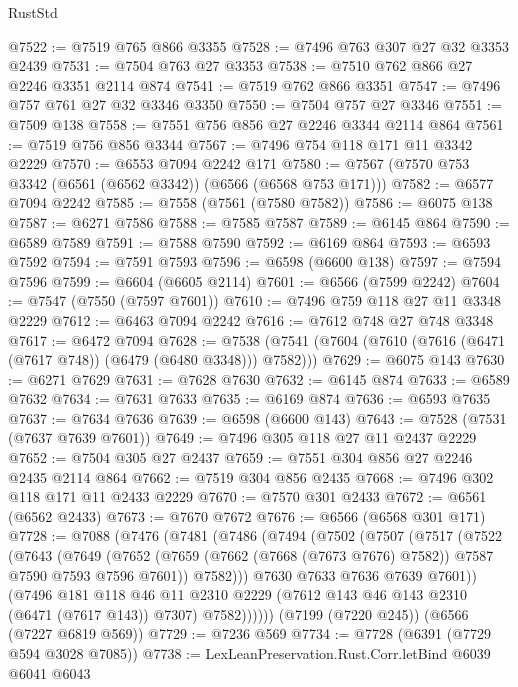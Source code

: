 \begin{lexlean}{RustStd}
\begin{coremodule}
@7522 := @7519 @765 @866 @3355
@7528 := @7496 @763 @307 @27 @32 @3353 @2439
@7531 := @7504 @763 @27 @3353
@7538 := @7510 @762 @866 @27 @2246 @3351 @2114 @874
@7541 := @7519 @762 @866 @3351
@7547 := @7496 @757 @761 @27 @32 @3346 @3350
@7550 := @7504 @757 @27 @3346
@7551 := @7509 @138
@7558 := @7551 @756 @856 @27 @2246 @3344 @2114 @864
@7561 := @7519 @756 @856 @3344
@7567 := @7496 @754 @118 @171 @11 @3342 @2229
@7570 := @6553 @7094 @2242 @171
@7580 := @7567 (@7570 @753 @3342 (@6561 (@6562 @3342)) (@6566 (@6568 @753 @171)))
@7582 := @6577 @7094 @2242
@7585 := @7558 (@7561 (@7580 @7582))
@7586 := @6075 @138
@7587 := @6271 @7586
@7588 := @7585 @7587
@7589 := @6145 @864
@7590 := @6589 @7589
@7591 := @7588 @7590
@7592 := @6169 @864
@7593 := @6593 @7592
@7594 := @7591 @7593
@7596 := @6598 (@6600 @138)
@7597 := @7594 @7596
@7599 := @6604 (@6605 @2114)
@7601 := @6566 (@7599 @2242)
@7604 := @7547 (@7550 (@7597 @7601))
@7610 := @7496 @759 @118 @27 @11 @3348 @2229
@7612 := @6463 @7094 @2242
@7616 := @7612 @748 @27 @748 @3348
@7617 := @6472 @7094
@7628 := @7538 (@7541 (@7604 (@7610 (@7616 (@6471 (@7617 @748)) (@6479 (@6480 @3348))) @7582)))
@7629 := @6075 @143
@7630 := @6271 @7629
@7631 := @7628 @7630
@7632 := @6145 @874
@7633 := @6589 @7632
@7634 := @7631 @7633
@7635 := @6169 @874
@7636 := @6593 @7635
@7637 := @7634 @7636
@7639 := @6598 (@6600 @143)
@7643 := @7528 (@7531 (@7637 @7639 @7601))
@7649 := @7496 @305 @118 @27 @11 @2437 @2229
@7652 := @7504 @305 @27 @2437
@7659 := @7551 @304 @856 @27 @2246 @2435 @2114 @864
@7662 := @7519 @304 @856 @2435
@7668 := @7496 @302 @118 @171 @11 @2433 @2229
@7670 := @7570 @301 @2433
@7672 := @6561 (@6562 @2433)
@7673 := @7670 @7672
@7676 := @6566 (@6568 @301 @171)
@7728 := @7088
    (@7476
      (@7481
        (@7486
          (@7494
            (@7502
              (@7507
                (@7517
                  (@7522
                    (@7643
                      (@7649
                        (@7652
                          (@7659 (@7662 (@7668 (@7673 @7676) @7582)) @7587 @7590 @7593 @7596 @7601))
                        @7582)))
                  @7630
                  @7633
                  @7636
                  @7639
                  @7601))
              (@7496
                @181
                @118
                @46
                @11
                @2310
                @2229
                (@7612 @143 @46 @143 @2310 (@6471 (@7617 @143)) @7307)
                @7582))))))
    (@7199 (@7220 @245))
    (@6566 (@7227 @6819 @569))
@7729 := @7236 @569
@7734 := @7728 (@6391 (@7729 @594 @3028 @7085))
@7738 := LexLeanPreservation.Rust.Corr.letBind @6039 @6041 @6043

\end{coremodule}
\end{lexlean}
